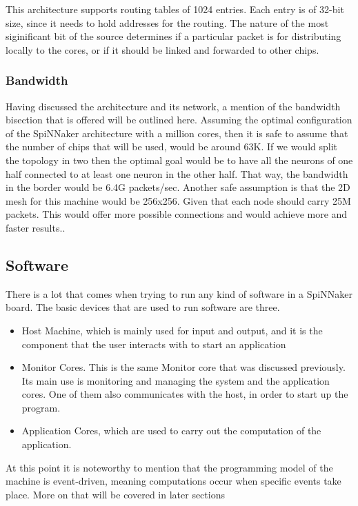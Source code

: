 \documentclass[12pt,a4paper]{article}
\begin{document}
This architecture supports routing tables of 1024 entries. Each entry is of 32-bit size, since it needs to hold addresses for the routing. The nature of the most siginificant bit of the source determines if a particular packet is for distributing locally to the cores, or if it should be linked and forwarded to other chips\cite{docfile}.
\subsubsection{Bandwidth}
Having discussed the architecture and its network, a mention of the bandwidth bisection that is offered will be outlined here. Assuming the optimal configuration of the SpiNNaker architecture with a million cores, then it is safe to assume that the number of chips that will be used, would be around 63K. If we would split the topology in two then the optimal goal would be to have all the neurons of one half connected to at least one neuron in the other half. That way, the bandwidth in the border would be 6.4G packets/sec. Another safe assumption is that the 2D mesh for this machine would be 256x256. Given that each node should carry 25M packets. This would offer more possible connections and would achieve more and faster results.\cite{docfile}\cite{navaridas2009understanding}.
\newpage
\subsection{Software}
There is a lot that comes when trying to run any kind of software in a SpiNNaker board. The basic devices that are used to run software are three.
\begin{itemize}
\item Host Machine, which is mainly used for input and output, and it is the component that the user interacts with to start an application
\item Monitor Cores. This is the same Monitor core that was discussed previously. Its main use is monitoring and managing the system and the application cores. One of them also communicates with the host, in order to start up the program.
\item Application Cores, which are used to carry out the computation of the application.\cite{furber2012overview}
\end{itemize}

At this point it is noteworthy to mention that the programming model of the machine is event-driven, meaning computations occur when specific events take place. More on that will be covered in later sections
\end{document}
